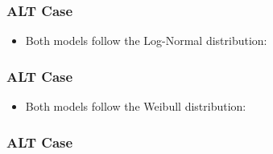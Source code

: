 \documentclass[xcolor=dvipsnames,aspectratio=1610]{beamer}
\begin{document}

\begin{frame}
\frametitle{ALT Case}
\begin{itemize}
\item Both models follow the Log-Normal distribution:
\end{itemize}

\begin{figure}
\end{figure}

\end{frame}



\begin{frame}
\frametitle{ALT Case}
\begin{itemize}
\item Both models follow the Weibull distribution:
\end{itemize}

\begin{figure}
\end{figure}

\end{frame}




\begin{frame}
\frametitle{ALT Case}

\begin{figure}
\end{figure}
\end{frame}
\end{document}
